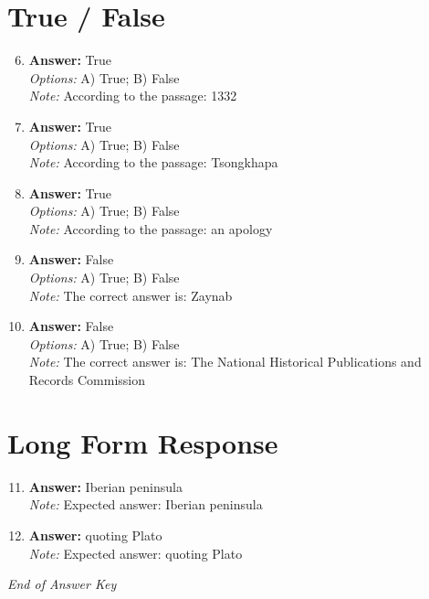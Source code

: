 \documentclass[12pt]{article}
\begin{document}
\section*{True / False}
\begin{enumerate}[label=\arabic*.]
\setcounter{enumi}{5}
\item \textbf{Answer:} True
\\ \textit{Options:} A) True; B) False
\\ \textit{Note:} According to the passage: 1332
\item \textbf{Answer:} True
\\ \textit{Options:} A) True; B) False
\\ \textit{Note:} According to the passage: Tsongkhapa
\item \textbf{Answer:} True
\\ \textit{Options:} A) True; B) False
\\ \textit{Note:} According to the passage: an apology
\item \textbf{Answer:} False
\\ \textit{Options:} A) True; B) False
\\ \textit{Note:} The correct answer is: Zaynab
\item \textbf{Answer:} False
\\ \textit{Options:} A) True; B) False
\\ \textit{Note:} The correct answer is: The National Historical Publications and Records Commission
\end{enumerate}

\section*{Long Form Response}
\begin{enumerate}[label=\arabic*.]
\setcounter{enumi}{10}
\item \textbf{Answer:} Iberian peninsula
\\ \textit{Note:} Expected answer: Iberian peninsula
\item \textbf{Answer:} quoting Plato
\\ \textit{Note:} Expected answer: quoting Plato
\end{enumerate}

\vfill
\noindent\textit{End of Answer Key}
\end{document}
